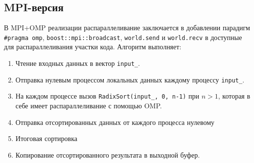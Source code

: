 \documentclass[a4paper,12pt]{article}
\begin{document}
\subsection{MPI-версия}
\hspace*{1.25em}В MPI+OMP реализации распараллеливание заключается в добавлении парадигм \texttt{\#pragma omp}, \texttt{boost::mpi::broadcast}, \texttt{world.send} и \texttt{world.recv} в доступные для распараллеливания участки кода. Алгоритм выполняет:
\begin{enumerate}
    \item Чтение входных данных в вектор \texttt{input\_}.
    \item Отправка нулевым процессом локальных данных каждому процессу \texttt{input\_}.
    \item На каждом процессе вызов \texttt{RadixSort(input\_, 0, n-1)} при $n>1$, которая в себе имеет распараллеливание с помощью OMP.
    \item Отправка отсортированных данных от каждого процесса нулевому
    \item Итоговая сортировка
    \item Копирование отсортированного результата в выходной буфер.
\end{enumerate}
\newpage
\end{document}
